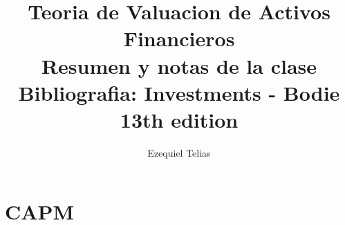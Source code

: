 \documentclass{article}
\title{
    \textbf{Teoria de Valuacion de Activos Financieros} \\ 
    Resumen y notas de la clase
    \\
    \small Bibliografia: Investments - Bodie 13th edition
}
\author{Ezequiel Telias}
\date{}
\begin{document}
\maketitle

\section{CAPM}
\end{document}
